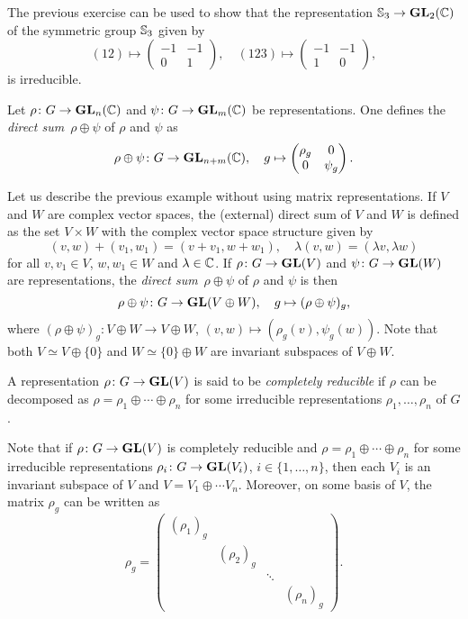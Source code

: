 The previous exercise can be used to show that the representation
$\mathbb{S}_3\to\mathbf{GL}_2(\mathbb{C})$
of the symmetric group $\mathbb{S}_3$
given by
\[
(12)\mapsto\begin{pmatrix}
-1&-1\\0&1
\end{pmatrix},
\quad
(123)\mapsto\begin{pmatrix}
-1&-1\\
1&0
\end{pmatrix},
\]
is irreducible.

\begin{example}
\label{exa:direct_sum_reps}
Let $\rho\colon G\to\mathbf{GL}_n(\mathbb{C})$ and $\psi\colon G\to\mathbf{GL}_m(\mathbb{C})$ be representations. One defines
the \emph{direct sum} $\rho\oplus\psi$ of $\rho$ and $\psi$ as 
\[
\rho\oplus\psi\colon G\to\mathbf{GL}_{n+m}(\mathbb{C}),\quad
g\mapsto 
\begin{pmatrix}
\rho_g & 0\\
0 & \psi_g	
\end{pmatrix}.
\]
\end{example}

Let us describe the previous example without using matrix representations. If $V$ and 
$W$ are complex vector spaces, the (external) direct sum of $V$ and $W$ is defined
as the set $V\times W$ with the complex vector space structure given by
\[
(v,w)+(v_1,w_1)=(v+v_1,w+w_1),\quad
\lambda (v,w)=(\lambda v,\lambda w)
\]
for all $v,v_1\in V$, $w,w_1\in W$ and $\lambda\in\mathbb{C}$. 
If $\rho\colon G\to\mathbf{GL}(V)$ and $\psi\colon G\to\mathbf{GL}(W)$ are representations, 
the \emph{direct sum} $\rho\oplus\psi$ of $\rho$ and $\psi$ is then 
\[
\rho\oplus\psi\colon G\to\mathbf{GL}(V\oplus W),\quad
g\mapsto (\rho\oplus\psi)_g,
\]
where $(\rho\oplus\psi)_g\colon V\oplus W\to V\oplus W$, 
$(v,w)\mapsto (\rho_g(v),\psi_g(w))$. Note that both 
$V\simeq V\oplus\{0\}$ and $W\simeq \{0\}\oplus W$ are
invariant subspaces of $V\oplus W$. 

\begin{definition}
    A representation $\rho\colon G\to\mathbf{GL}(V)$ is said to be 
    \emph{completely reducible}
    if $\rho$ can be decomposed as
    $\rho=\rho_1\oplus\cdots\oplus \rho_n$ for some irreducible
    representations $\rho_1,\dots,\rho_n$ of $G$. 
\end{definition}

Note that if $\rho\colon G\to\mathbf{GL}(V)$ is completely reducible and 
$\rho=\rho_1\oplus\cdots\oplus \rho_n$ for some irreducible representations 
$\rho_i\colon G\to\mathbf{GL}(V_i)$, $i\in\{1,\dots,n\}$, then 
each $V_i$ is an invariant subspace of $V$ and $V=V_1\oplus \cdots V_n$. 
Moreover, on some basis of $V$, the matrix  
$\rho_g$ can be written as 
\[
\rho_g=\begin{pmatrix}
(\rho_1)_g &  \\
& (\rho_2)_g  \\
&&\ddots\\
&&&(\rho_n)_g	
\end{pmatrix}.
\]

